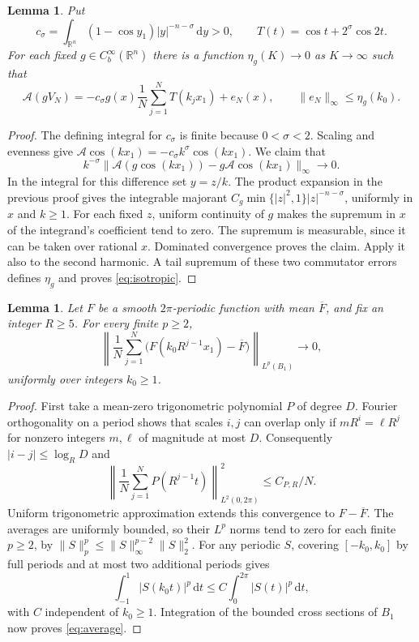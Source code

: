 \documentclass[11pt]{article}
\newcommand{\R}{\mathbb R}
\newcommand{\dd}{\,\mathrm d}
\newcommand{\A}{\mathcal A}
\newcommand{\norm}[1]{\lVert#1\rVert}
\newcommand{\Cb}{C_b^\infty(\R^n)}
\newtheorem{lemma}[theorem]{Lemma}
\theoremstyle{remark}
\numberwithin{equation}{section}
\begin{document}
\begin{lemma}\label{lem:isotropic}
Put
\[
 c_\sigma=\int_{\R^n}(1-\cos y_1)|y|^{-n-\sigma}\dd y>0,
 \qquad T(t)=\cos t+2^\sigma\cos 2t.
\]
For each fixed $g\in\Cb$ there is a function $\eta_g(K)\to0$ as
$K\to\infty$ such that
\begin{equation}\label{eq:isotropic}
 \A(gV_N)=-c_\sigma g(x)\frac1N\sum_{j=1}^N T(k_jx_1)+e_N(x),
 \qquad \norm{e_N}_\infty\le\eta_g(k_0).
\end{equation}
\end{lemma}
\begin{proof}
The defining integral for $c_\sigma$ is finite because $0<\sigma<2$.
Scaling and evenness give $\A\cos(kx_1)=-c_\sigma k^\sigma\cos(kx_1)$.
We claim that
\[
 k^{-\sigma}\norm{\A(g\cos(kx_1))-g\A\cos(kx_1)}_\infty\longrightarrow0.
\]
In the integral for this difference set $y=z/k$. The product expansion in
the previous proof gives the integrable majorant
$C_g\min\{|z|^2,1\}|z|^{-n-\sigma}$, uniformly in $x$ and $k\ge1$.
For each fixed $z$, uniform continuity of $g$ makes the supremum in $x$
of the integrand's coefficient tend to zero. The supremum is measurable,
since it can be taken over rational $x$. Dominated convergence proves
the claim. Apply it also to the second harmonic. A tail supremum of these
two commutator errors defines $\eta_g$ and proves \eqref{eq:isotropic}.
\end{proof}

\begin{lemma}\label{lem:averaging}
Let $F$ be a smooth $2\pi$-periodic function with mean $\overline F$, and
fix an integer $R\ge5$. For every finite $p\ge2$,
\begin{equation}\label{eq:average}
 \left\|\frac1N\sum_{j=1}^N
        \bigl(F(k_0R^{j-1}x_1)-\overline F\bigr)\right\|_{L^p(B_1)}
 \longrightarrow0,
\end{equation}
uniformly over integers $k_0\ge1$.
\end{lemma}
\begin{proof}
First take a mean-zero trigonometric polynomial $P$ of degree $D$.
Fourier orthogonality on a period shows that scales $i,j$ can overlap
only if $mR^i=\ell R^j$ for nonzero integers $m,\ell$ of magnitude at
most $D$. Consequently $|i-j|\le\log_R D$ and
\[
 \left\|\frac1N\sum_{j=1}^N P(R^{j-1}t)\right\|_{L^2(0,2\pi)}^2
 \le C_{P,R}/N.
\]
Uniform trigonometric approximation extends this convergence to
$F-\overline F$. The averages are uniformly bounded, so their $L^p$
norms tend to zero for each finite $p\ge2$, by
$\norm S_p^p\le\norm S_\infty^{p-2}\norm S_2^2$.
For any periodic $S$, covering $[-k_0,k_0]$ by full periods and at most
two additional periods gives
\[
 \int_{-1}^1|S(k_0t)|^p\dd t\le C\int_0^{2\pi}|S(t)|^p\dd t,
\]
with $C$ independent of $k_0\ge1$. Integration of the bounded cross
sections of $B_1$ now proves \eqref{eq:average}.
\end{proof}
\end{document}
